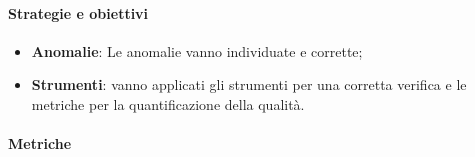             \paragraph{Strategie e obiettivi}
            \begin{itemize}
                \item \textbf{Anomalie}: Le anomalie vanno individuate e corrette;
                \item \textbf{Strumenti}: vanno applicati gli strumenti per una corretta verifica e le metriche per la quantificazione della qualità.
            \end{itemize}
            
            \paragraph{Metriche}
            
            \hphantom{}
            \def\productquality{
                {   Code coverage,
                    $\frac{Testate}{Totali}$,
                    $ 75 \%$,
                    $ 100 \% $
                },
                {   Numero di test superati,
                    numero intero,
                    = numero totale di test,
                    = numero totale di test
                },
            }
            
         
         
         
